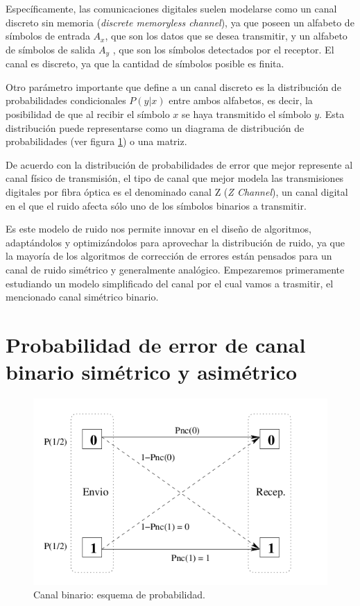 Específicamente, las comunicaciones digitales suelen modelarse como un canal discreto sin memoria (\textit{discrete memoryless channel}), ya que poseen un alfabeto de símbolos de entrada $A_{x}$, que son los datos que se desea transmitir, y un alfabeto de símbolos de salida $A_{y}$ , que son los símbolos detectados por el receptor. El canal es discreto, ya que la cantidad de símbolos posible es finita. 


Otro parámetro importante que define a un canal discreto es la distribución de probabilidades condicionales $P(y|x)$ entre ambos alfabetos, es decir, la posibilidad de que al recibir el símbolo $x$ se haya transmitido el símbolo $y$. Esta distribución puede representarse como un diagrama de distribución de probabilidades (ver figura \ref{fig:canbin}) o una matriz.

De acuerdo con la distribución de probabilidades de error que mejor represente al canal físico de transmisión, el tipo de canal que mejor modela las transmisiones digitales por fibra óptica es el denominado canal Z (\textit{Z Channel}), un canal digital en el que el ruido afecta sólo uno de los símbolos binarios a transmitir.

Es este modelo de ruido nos permite innovar en el diseño de algoritmos, adaptándolos y optimizándolos para aprovechar la distribución de ruido, ya que la mayoría de los algoritmos de corrección de errores están pensados para un canal de ruido simétrico y generalmente analógico.
Empezaremos primeramente estudiando un modelo simplificado del canal por el cual vamos a trasmitir, el mencionado canal simétrico binario.

\section{Probabilidad de error de canal binario simétrico y asimétrico}

\begin{figure}[t]
  \begin{center}
    \includegraphics[scale=0.50]{graphs/canalBinario.png}
  \end{center}
\caption {Canal binario: esquema de probabilidad.}
\label{fig:canbin}
\end{figure}

